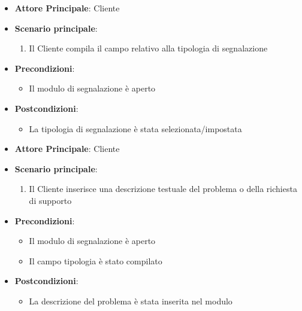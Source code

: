 \label{uc_24.1}
\begin{itemize}
    \item \textbf{Attore Principale}: Cliente
	\item \textbf{Scenario principale}:
	\begin{enumerate}
		\item Il Cliente compila il campo relativo alla tipologia di segnalazione
	\end{enumerate}
	\item \textbf{Precondizioni}:
	\begin{itemize}
		\item Il modulo di segnalazione è aperto
	\end{itemize}
	\item \textbf{Postcondizioni}:
	\begin{itemize}
		\item La tipologia di segnalazione è stata selezionata/impostata
	\end{itemize}
\end{itemize}

\label{uc_24.2}
\begin{itemize}
    \item \textbf{Attore Principale}: Cliente
	\item \textbf{Scenario principale}:
	\begin{enumerate}
		\item Il Cliente inserisce una descrizione testuale del problema o della richiesta di supporto
	\end{enumerate}
	\item \textbf{Precondizioni}:
	\begin{itemize}
		\item Il modulo di segnalazione è aperto
		\item Il campo tipologia è stato compilato
	\end{itemize}
	\item \textbf{Postcondizioni}:
	\begin{itemize}
		\item La descrizione del problema è stata inserita nel modulo
	\end{itemize}
\end{itemize}

